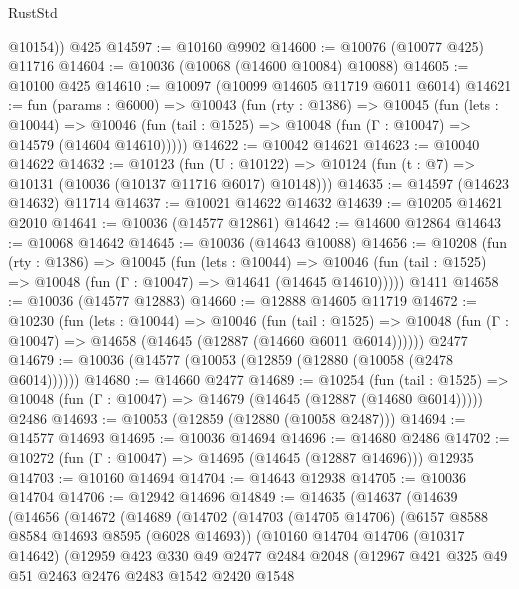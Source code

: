 \begin{lexlean}{RustStd}
\begin{coremodule}
{{        @10154))
    @425
@14597 := @10160 @9902
@14600 := @10076 (@10077 @425) @11716
@14604 := @10036 (@10068 (@14600 @10084) @10088)
@14605 := @10100 @425
@14610 := @10097 (@10099 @14605 @11719 @6011 @6014)
@14621 := fun (params : @6000) =>
  @10043
    (fun (rty : @1386) =>
    @10045
      (fun (lets : @10044) =>
      @10046 (fun (tail : @1525) => @10048 (fun (Γ : @10047) => @14579 (@14604 @14610)))))
@14622 := @10042 @14621
@14623 := @10040 @14622
@14632 := @10123
    (fun (U : @10122) => @10124 (fun (t : @7) => @10131 (@10036 (@10137 @11716 @6017) @10148)))
@14635 := @14597 (@14623 @14632) @11714
@14637 := @10021 @14622 @14632
@14639 := @10205 @14621 @2010
@14641 := @10036 (@14577 @12861)
@14642 := @14600 @12864
@14643 := @10068 @14642
@14645 := @10036 (@14643 @10088)
@14656 := @10208
    (fun (rty : @1386) =>
    @10045
      (fun (lets : @10044) =>
      @10046 (fun (tail : @1525) => @10048 (fun (Γ : @10047) => @14641 (@14645 @14610)))))
    @1411
@14658 := @10036 (@14577 @12883)
@14660 := @12888 @14605 @11719
@14672 := @10230
    (fun (lets : @10044) =>
    @10046
      (fun (tail : @1525) =>
      @10048 (fun (Γ : @10047) => @14658 (@14645 (@12887 (@14660 @6011 @6014))))))
    @2477
@14679 := @10036 (@14577 (@10053 (@12859 (@12880 (@10058 (@2478 @6014))))))
@14680 := @14660 @2477
@14689 := @10254
    (fun (tail : @1525) => @10048 (fun (Γ : @10047) => @14679 (@14645 (@12887 (@14680 @6014)))))
    @2486
@14693 := @10053 (@12859 (@12880 (@10058 @2487)))
@14694 := @14577 @14693
@14695 := @10036 @14694
@14696 := @14680 @2486
@14702 := @10272 (fun (Γ : @10047) => @14695 (@14645 (@12887 @14696))) @12935
@14703 := @10160 @14694
@14704 := @14643 @12938
@14705 := @10036 @14704
@14706 := @12942 @14696
@14849 := @14635
    (@14637
      (@14639
        (@14656
          (@14672
            (@14689
              (@14702
                (@14703
                  (@14705 @14706)
                  (@6157 @8588 @8584 @14693 @8595 (@6028 @14693))
                  (@10160
                    @14704
                    @14706
                    (@10317 @14642)
                    (@12959
                      @423
                      @330
                      @49
                      @2477
                      @2484
                      @2048
                      (@12967
                        @421
                        @325
                        @49
                        @51
                        @2463
                        @2476
                        @2483
                        @1542
                        @2420
                        @1548
}}
\end{coremodule}
\end{lexlean}
